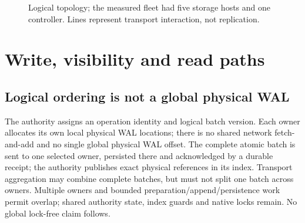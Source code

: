 \documentclass[11pt,a4paper]{article}
\begin{document}
\begin{figure}[htbp]\centering
{}
\caption{Logical topology; the measured fleet had five storage hosts and one controller. Lines represent transport interaction, not replication.}\label{fig:topology}
\end{figure}

\section{Write, visibility and read paths}\label{sec:paths}
\subsection{Logical ordering is not a global physical WAL}
The authority assigns an operation identity and logical batch version. Each owner allocates its own local physical WAL locations; there is no shared network fetch-and-add and no single global physical WAL offset. The complete atomic batch is sent to one selected owner, persisted there and acknowledged by a durable receipt; the authority publishes exact physical references in its index. Transport aggregation may combine complete batches, but must not split one batch across owners. Multiple owners and bounded preparation/append/persistence work permit overlap; shared authority state, index guards and native locks remain. No global lock-free claim follows.
\end{document}
